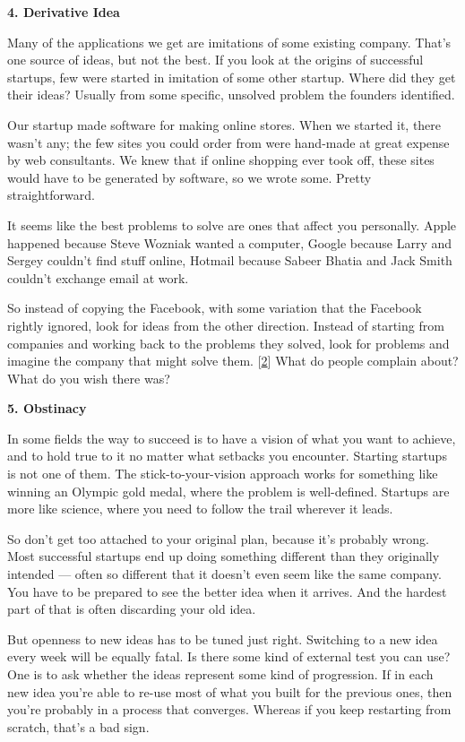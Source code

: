 \textbf{4. Derivative Idea}

Many of the applications we get are imitations of some existing company.
That's one source of ideas, but not the best. If you look at the origins
of successful startups, few were started in imitation of some other
startup. Where did they get their ideas? Usually from some specific,
unsolved problem the founders identified.

Our startup made software for making online stores. When we started it,
there wasn't any; the few sites you could order from were hand-made at
great expense by web consultants. We knew that if online shopping ever
took off, these sites would have to be generated by software, so we
wrote some. Pretty straightforward.

It seems like the best problems to solve are ones that affect you
personally. Apple happened because Steve Wozniak wanted a computer,
Google because Larry and Sergey couldn't find stuff online, Hotmail
because Sabeer Bhatia and Jack Smith couldn't exchange email at work.

So instead of copying the Facebook, with some variation that the
Facebook rightly ignored, look for ideas from the other direction.
Instead of starting from companies and working back to the problems they
solved, look for problems and imagine the company that might solve them.
{[}\hyperref[f2n]{2}{]} What do people complain about? What do you wish
there was?

\textbf{5. Obstinacy}

In some fields the way to succeed is to have a vision of what you want
to achieve, and to hold true to it no matter what setbacks you
encounter. Starting startups is not one of them. The
stick-to-your-vision approach works for something like winning an
Olympic gold medal, where the problem is well-defined. Startups are more
like science, where you need to follow the trail wherever it leads.

So don't get too attached to your original plan, because it's probably
wrong. Most successful startups end up doing something different than
they originally intended --- often so different that it doesn't even
seem like the same company. You have to be prepared to see the better
idea when it arrives. And the hardest part of that is often discarding
your old idea.

But openness to new ideas has to be tuned just right. Switching to a new
idea every week will be equally fatal. Is there some kind of external
test you can use? One is to ask whether the ideas represent some kind of
progression. If in each new idea you're able to re-use most of what you
built for the previous ones, then you're probably in a process that
converges. Whereas if you keep restarting from scratch, that's a bad
sign.

